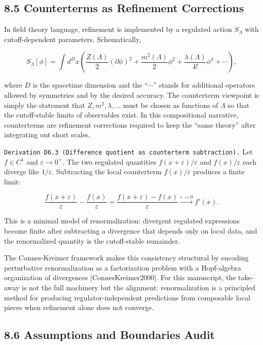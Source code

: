 \documentclass[
]{article}
\begin{document}
\hypertarget{counterterms-as-refinement-corrections}{%
\subsection{8.5 Counterterms as Refinement
Corrections}\label{counterterms-as-refinement-corrections}}

In field theory language, refinement is implemented by a regulated
action \(S_\Lambda\) with cutoff-dependent parameters. Schematically,

\[
S_\Lambda[\phi]
=
\int d^D x\left(
\frac{Z(\Lambda)}{2}(\partial\phi)^2
+\frac{m^2(\Lambda)}{2}\phi^2
+\frac{\lambda(\Lambda)}{4!}\phi^4
+\cdots
\right),
\]

where \(D\) is the spacetime dimension and the ``\(\cdots\)'' stands for
additional operators allowed by symmetries and by the desired accuracy.
The counterterm viewpoint is simply the statement that
\(Z,m^2,\lambda,\ldots\) must be chosen as functions of \(\Lambda\) so
that the cutoff-stable limits of observables exist. In this
compositional narrative, counterterms are refinement corrections
required to keep the ``same theory'' after integrating out short scales.

\texttt{Derivation\ D6.3\ (Difference\ quotient\ as\ counterterm\ subtraction).}
Let \(f\in C^1\) and \(\varepsilon\to 0^+\). The two regulated
quantities \(f(x+\varepsilon)/\varepsilon\) and \(f(x)/\varepsilon\)
each diverge like \(1/\varepsilon\). Subtracting the local counterterm
\(f(x)/\varepsilon\) produces a finite limit:

\[
\frac{f(x+\varepsilon)}{\varepsilon}-\frac{f(x)}{\varepsilon}
=\frac{f(x+\varepsilon)-f(x)}{\varepsilon}
\xrightarrow{\varepsilon\to0} f'(x).
\]

This is a minimal model of renormalization: divergent regulated
expressions become finite after subtracting a divergence that depends
only on local data, and the renormalized quantity is the cutoff-stable
remainder.

The Connes-Kreimer framework makes this consistency structural by
encoding perturbative renormalization as a factorization problem with a
Hopf-algebra organization of divergences {[}ConnesKreimer2000{]}. For
this manuscript, the take-away is not the full machinery but the
alignment: renormalization is a principled method for producing
regulator-independent predictions from composable local pieces when
refinement alone does not converge.

\hypertarget{assumptions-and-boundaries-audit}{%
\subsection{8.6 Assumptions and Boundaries
Audit}\label{assumptions-and-boundaries-audit}}
\end{document}
